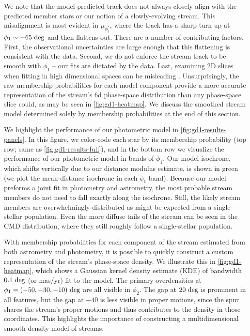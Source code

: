 \documentclass[twocolumn, linenumbers]{aastex631}
\begin{document}
        We note that the model-predicted track does not always closely align
        with the predicted member stars or our notion of a slowly-evolving
        stream. This misalignment is most evident in $\mu_{\phi_1^*}$, where the
        track has a sharp turn up at $\phi_1 \sim -65 \ \rm{deg}$ and then
        flattens out. There are a number of contributing factors. First, the
        observational uncertainties are large enough that this flattening is
        consistent with the data. Second, we do not enforce the stream track to
        be smooth with $\phi_1$ -- our fits are dictated by the data.  Last,
        examining 2D slices when fitting in high dimensional spaces can be
        misleading \citep{Aggarwal+2002}. Unsurprisingly, the raw membership
        probabilities for each model component provide a more accurate
        representation of the stream's 6d phase-space distribution than any
        phase-space slice could, as may be seen in \autoref{fig:gd1-heatmap}. We
        discuss the smoothed stream model determined solely by membership
        probabilities at the end of this section.

        We highlight the performance of our photometric model in
        \autoref{fig:gd1-results-panels}. In this figure, we color-code each
        star by its membership probability (top row; same as
        \autoref{fig:gd1-results-full}), and in the bottom row we visualize the
        performance of our photometric model in bands of $\phi_1$. Our model
        isochrone, which shifts vertically due to our distance modulus estimate,
        is shown in green (we plot the mean-distance isochrone in each $\phi_1$
        band). Because our model preforms a joint fit in photometry and
        astrometry, the most probable stream members do not need to fall exactly
        along the isochrone.  Still, the likely stream members are
        overwhelmingly distributed as might be expected from a single-stellar
        population.  Even the more diffuse tails of the stream can be seen in
        the CMD distribution, where they still roughly follow a single-stellar
        population.

        With membership probabilities for each component of the stream estimated
        from both astrometry and photometry, it is possible to quickly construct
        a custom representation of the stream's phase-space density. We
        illustrate this in  \autoref{fig:gd1-heatmap}, which shows a Gaussian
        kernel density estimate (KDE) of bandwidth $0.1 \ \rm{deg}$ (or mas/yr)
        fit to the model. The primary overdensities at $\phi_1 = (-50, -30, -10)
        \ \rm{deg}$ are all visible in $\phi_2$. The gap at $20 \ \rm{deg}$ is
        prominent in all features, but the gap at $-40$ is less visible in
        proper motions, since the spur shares the stream's proper motions and
        thus contributes to the density in those coordinates. This highlights
        the importance of constructing a multidimensional smooth density model
        of streams.
\end{document}
